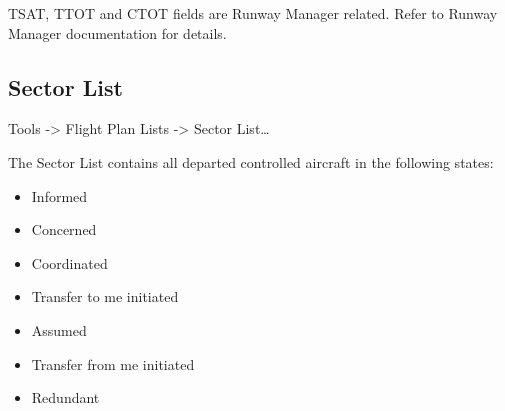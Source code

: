 \documentclass[a4paper,oneside,11pt]{memoir}
\begin{document}
TSAT, TTOT and CTOT fields are Runway Manager related. Refer to Runway Manager documentation for details.

\subsection{Sector List}\label{list:sector}

 Tools -> Flight Plan Lists -> Sector List…

The Sector List contains all departed controlled aircraft in the following states:

\bigskip

\begin{itemize}
    \item Informed\footnotemark[1]
    \item Concerned\footnotemark[1]\footnotemark[2]
    \item Coordinated
    \item Transfer to me initiated
    \item Assumed
    \item Transfer from me initiated
    \item Redundant\footnotemark[1]
\end{itemize}


\end{document}
